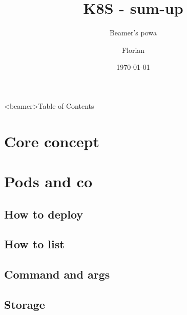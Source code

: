\documentclass[8pt]{beamer}
\title{K8S - sum-up}
\subtitle{Beamer's powa}
\author{Florian}
\institute{Tourism's institute of nowhere}
\date{\today}
\begin{document}
\begin{frame}
\titlepage{}
\end{frame}

\begin{frame}<beamer>{Table of Contents}
  \tableofcontents[]
\end{frame}

\section{Core concept}




\section{Pods and co}
\subsection{How to deploy}







\subsection{How to list}




\subsection{Command and args}



\subsection{Storage}




\end{document}
